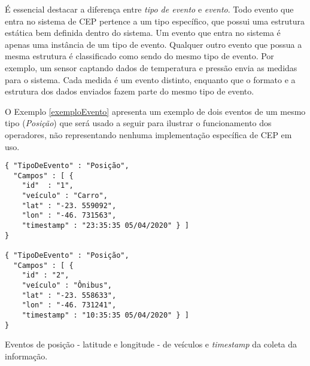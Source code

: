 % 
É essencial destacar a diferença entre \textit{tipo de evento} e \textit{evento}. Todo evento que entra no sistema de CEP pertence a um tipo específico, que possui uma estrutura estática bem definida dentro do sistema. Um evento que entra no sistema é apenas uma instância de um tipo de evento. Qualquer outro evento que possua a mesma estrutura é classificado como sendo do mesmo tipo de evento. Por exemplo, um sensor captando dados de temperatura e pressão envia as medidas para o sistema. Cada medida é um evento distinto, enquanto que o formato e a estrutura dos dados enviados fazem parte do mesmo tipo de evento. %

O Exemplo \ref{exemploEvento} apresenta um exemplo de dois eventos de um mesmo tipo (\textit{Posição}) que será usado a seguir para ilustrar o funcionamento dos operadores, não representando nenhuma implementação específica de CEP em uso.







\begin{evento}[t]

\begin{verbatim} 
{ "TipoDeEvento" : "Posição",
  "Campos" : [ {
    "id"  : "1",
    "veículo" : "Carro",
    "lat" : "-23. 559092",
    "lon" : "-46. 731563",
    "timestamp" : "23:35:35 05/04/2020" } ]
}

{ "TipoDeEvento" : "Posição",
  "Campos" : [ {
    "id" : "2",
    "veículo" : "Ônibus",
    "lat" : "-23. 558633",
    "lon" : "-46. 731241",
    "timestamp" : "10:35:35 05/04/2020" } ]
}
\end{verbatim}
\caption{Eventos de posição - latitude e longitude - de veículos e \textit{timestamp} da coleta da informação.}
\label{exemploEvento}
\end{evento}


